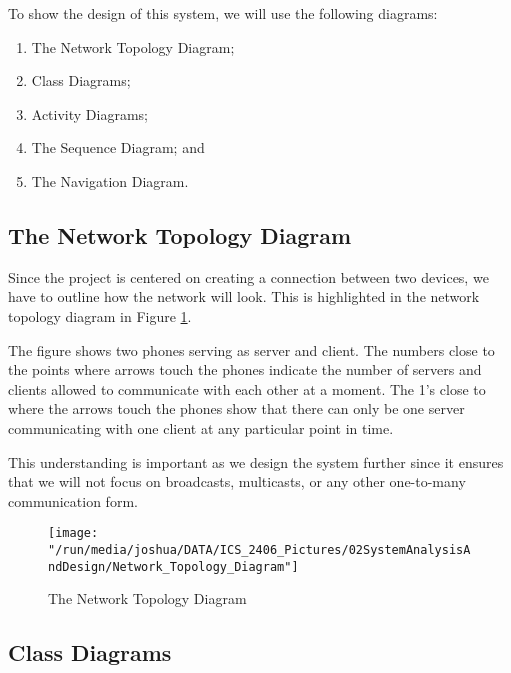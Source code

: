 \documentclass[12pt,svgnames,smaller]{article} %
\begin{document}
	To show the design of this system, we will use the following diagrams:
	
	\begin{enumerate}
		\item The Network Topology Diagram;
		\item Class Diagrams; 
		\item Activity Diagrams; 
		\item The Sequence Diagram; and
		\item The Navigation Diagram.
	\end{enumerate}
	
	\subsection{The Network Topology Diagram}
	
	Since the project is centered on creating a connection between two devices, we have to outline how the network will look. This is highlighted in the network topology diagram in Figure \ref{fig:SystemAnalysisandDesign-Network_Topology_Diagram}. 
	
	The figure shows two phones serving as server and client. The numbers close to the points where arrows touch the phones indicate the number of servers and clients allowed to communicate with each other at a moment. The 1's close to where the arrows touch the phones show that there can only be one server communicating with one client at any particular point in time. 
	
	This understanding is important as we design the system further since it ensures that we will not focus on broadcasts, multicasts, or any other one-to-many communication form.
	
	\begin{figure}
		\centering
		\texttt{[image: "/run/media/joshua/DATA/ICS\_2406\_Pictures/02SystemAnalysisAndDesign/Network\_Topology\_Diagram"]}
		\caption{The Network Topology Diagram}
		\label{fig:SystemAnalysisandDesign-Network_Topology_Diagram}
	\end{figure}
	
	
	\subsection{Class Diagrams}
	
\end{document}
